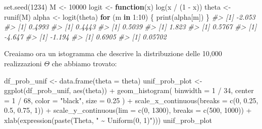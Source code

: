 \documentclass[
  11pt,
]{krantz}
\makeatletter
\newenvironment{Shaded}{\begin{snugshade}}{\end{snugshade}}
\newcommand{\AttributeTok}[1]{\textcolor[rgb]{0.61,0.61,0.61}{#1}}
\newcommand{\CommentTok}[1]{\textcolor[rgb]{0.37,0.37,0.37}{\textit{#1}}}
\newcommand{\ControlFlowTok}[1]{\textcolor[rgb]{0.27,0.27,0.27}{\textbf{#1}}}
\newcommand{\DecValTok}[1]{\textcolor[rgb]{0.06,0.06,0.06}{#1}}
\newcommand{\FloatTok}[1]{\textcolor[rgb]{0.06,0.06,0.06}{#1}}
\newcommand{\FunctionTok}[1]{\textcolor[rgb]{0,0,0}{#1}}
\newcommand{\NormalTok}[1]{#1}
\newcommand{\OtherTok}[1]{\textcolor[rgb]{0.37,0.37,0.37}{#1}}
\newcommand{\SpecialCharTok}[1]{\textcolor[rgb]{0,0,0}{#1}}
\newcommand{\StringTok}[1]{\textcolor[rgb]{0.5,0.5,0.5}{#1}}
\newenvironment{kframe}{%
\medskip{}
\setlength{\fboxsep}{.8em}
 \def\at@end@of@kframe{}%
 \ifinner\ifhmode%
  \def\at@end@of@kframe{\end{minipage}}%
  \begin{minipage}{\columnwidth}%
 \fi\fi%
 \def\FrameCommand##1{\hskip\@totalleftmargin \hskip-\fboxsep
 \colorbox{shadecolor}{##1}\hskip-\fboxsep
     \hskip-\linewidth \hskip-\@totalleftmargin \hskip\columnwidth}%
 \MakeFramed {\advance\hsize-\width
   \@totalleftmargin\z@ \linewidth\hsize
   \@setminipage}}%
 {\par\unskip\endMakeFramed%
 \at@end@of@kframe}
\renewenvironment{Shaded}{\begin{kframe}}{\end{kframe}}
\theoremstyle{definition}
\theoremstyle{definition}
\theoremstyle{definition}
\theoremstyle{definition}
\theoremstyle{remark}
\makeatother
\begin{document}
\begin{Shaded}
\begin{Highlighting}[]
\FunctionTok{set.seed}\NormalTok{(}\DecValTok{1234}\NormalTok{)}
\NormalTok{M }\OtherTok{\textless{}{-}} \DecValTok{10000}
\NormalTok{logit }\OtherTok{\textless{}{-}} \ControlFlowTok{function}\NormalTok{(x) }\FunctionTok{log}\NormalTok{(x }\SpecialCharTok{/}\NormalTok{ (}\DecValTok{1} \SpecialCharTok{{-}}\NormalTok{ x))}
\NormalTok{theta }\OtherTok{\textless{}{-}} \FunctionTok{runif}\NormalTok{(M)}
\NormalTok{alpha }\OtherTok{\textless{}{-}} \FunctionTok{logit}\NormalTok{(theta)}
\ControlFlowTok{for}\NormalTok{ (m }\ControlFlowTok{in} \DecValTok{1}\SpecialCharTok{:}\DecValTok{10}\NormalTok{) \{}
  \FunctionTok{print}\NormalTok{(alpha[m])}
\NormalTok{\}}
\CommentTok{\#\textgreater{} [1] {-}2.053}
\CommentTok{\#\textgreater{} [1] 0.4993}
\CommentTok{\#\textgreater{} [1] 0.4443}
\CommentTok{\#\textgreater{} [1] 0.5039}
\CommentTok{\#\textgreater{} [1] 1.823}
\CommentTok{\#\textgreater{} [1] 0.5767}
\CommentTok{\#\textgreater{} [1] {-}4.647}
\CommentTok{\#\textgreater{} [1] {-}1.194}
\CommentTok{\#\textgreater{} [1] 0.6905}
\CommentTok{\#\textgreater{} [1] 0.05702}
\end{Highlighting}
\end{Shaded}

Creaiamo ora un istogramma che descrive la distribuzione delle 10,000 realizzazioni \(\Theta\) che abbiamo trovato:

\begin{Shaded}
\begin{Highlighting}[]
\NormalTok{df\_prob\_unif }\OtherTok{\textless{}{-}} \FunctionTok{data.frame}\NormalTok{(}\AttributeTok{theta =}\NormalTok{ theta)}
\NormalTok{unif\_prob\_plot }\OtherTok{\textless{}{-}}
  \FunctionTok{ggplot}\NormalTok{(df\_prob\_unif, }\FunctionTok{aes}\NormalTok{(theta)) }\SpecialCharTok{+}
  \FunctionTok{geom\_histogram}\NormalTok{(}
    \AttributeTok{binwidth =} \DecValTok{1} \SpecialCharTok{/} \DecValTok{34}\NormalTok{, }\AttributeTok{center =} \DecValTok{1} \SpecialCharTok{/} \DecValTok{68}\NormalTok{, }\AttributeTok{color =} \StringTok{"black"}\NormalTok{,}
    \AttributeTok{size =} \FloatTok{0.25}
\NormalTok{  ) }\SpecialCharTok{+}
  \FunctionTok{scale\_x\_continuous}\NormalTok{(}\AttributeTok{breaks =} \FunctionTok{c}\NormalTok{(}\DecValTok{0}\NormalTok{, }\FloatTok{0.25}\NormalTok{, }\FloatTok{0.5}\NormalTok{, }\FloatTok{0.75}\NormalTok{, }\DecValTok{1}\NormalTok{)) }\SpecialCharTok{+}
  \FunctionTok{scale\_y\_continuous}\NormalTok{(}\AttributeTok{lim =} \FunctionTok{c}\NormalTok{(}\DecValTok{0}\NormalTok{, }\DecValTok{1300}\NormalTok{), }\AttributeTok{breaks =} \FunctionTok{c}\NormalTok{(}\DecValTok{500}\NormalTok{, }\DecValTok{1000}\NormalTok{)) }\SpecialCharTok{+}
  \FunctionTok{xlab}\NormalTok{(}\FunctionTok{expression}\NormalTok{(}\FunctionTok{paste}\NormalTok{(Theta, }\StringTok{" \textasciitilde{} Uniform(0, 1)"}\NormalTok{)))}
\NormalTok{unif\_prob\_plot}
\end{Highlighting}
\end{Shaded}
\end{document}
